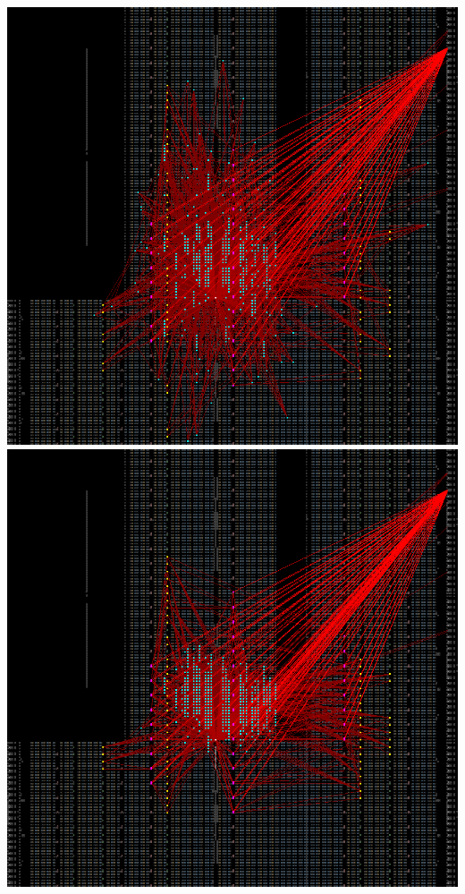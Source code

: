 {    \includegraphics[valign=t, scale=0.13]{figures/results/PlacerAnnealHybrid/00000100.png}
    \includegraphics[valign=t, scale=0.13]{figures/results/PlacerAnnealHybrid/00000299.png}
    \label{fig:PAHSnapshots}
}


